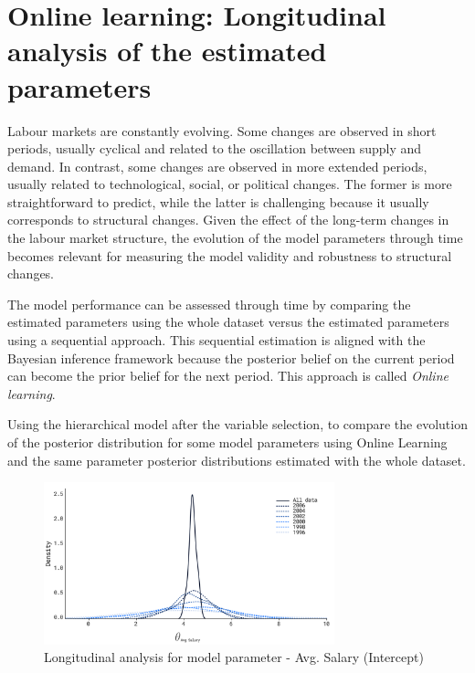 \section{Online learning: Longitudinal analysis of the estimated parameters }

Labour markets are constantly evolving. Some changes are observed in short periods, usually cyclical and related to the oscillation between supply and demand. In contrast, some changes are observed in more extended periods, usually related to technological, social, or political changes. The former is more straightforward to predict, while the latter is challenging because it usually corresponds to structural changes. Given the effect of the long-term changes in the labour market structure, the evolution of the model parameters through time becomes relevant for measuring the model validity and robustness to structural changes. 

The model performance can be assessed through time by comparing the estimated parameters using the whole dataset versus the estimated parameters using a sequential approach. This sequential estimation is aligned with the Bayesian inference framework because the posterior belief on the current period can become the prior belief for the next period. This approach is called \textit{Online learning}. 

Using the hierarchical model after the variable selection,  to  compare the evolution of the posterior distribution for some model parameters using Online Learning and the same parameter posterior distributions estimated with the whole dataset. 

\begin{figure}[H]
    \centering
    \includegraphics[width=0.75\textwidth]{images/ch5_online_learning/online_learning_salary.png}
    \setlength{\abovecaptionskip}{-10pt}
    \caption{Longitudinal analysis for model parameter - Avg. Salary (Intercept)}
    \label{fig:online_learning_salary}
\end{figure}


